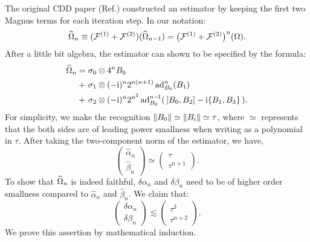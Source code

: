 \documentclass[b5paper,11pt]{article}
\begin{document}
The original CDD paper (Ref.\cite{khodjasteh2005fault}) constructed an estimator by keeping the first two Magnus terms for each iteration step. In
our notation:
\begin{equation}
    \widehat{\Omega}_{n} \equiv (
    \mathcal{F}^{(1)} + 
    \mathcal{F}^{(2)}) (\widehat{\Omega}_{n-1}) = \big(
    \mathcal{F}^{(1)} + 
    \mathcal{F}^{(2)}\big)^n (\Omega).
\end{equation}
After a little bit algebra, the estimator can shown to be specified by the formula:
\begin{align}\label{eq:cdd-estimator}
\widehat{\Omega}_{n} 
={} & \sigma_0 \otimes 4^n B_0 \notag \\
+\ & \sigma_1 \otimes (-\mathrm{i})^{n} 2^{n(n+1)} \operatorname{ad}_{B_0}^{n}(B_1)\\ 
+\ & \sigma_2 \otimes (-\mathrm{i})^{n} 2^{n^2} \operatorname{ad}_{B_0}^{n-\!1}( \,[B_0,B_2] - \mathrm{i} \{B_1,B_3\} \,). \notag
\end{align} 
 For simplicity, we make the recognition $\Vert {B_0} \Vert\simeq\Vert {B_i} \Vert\simeq\tau$, where $\simeq$ represents that the both sides are of leading power smallness when writing as a polynomial in $\tau$.
After taking the two-component norm of the estimator, we have,
\begin{equation}
\begin{pmatrix}
\widehat\alpha_{n}\\
\widehat\beta_{n}
\end{pmatrix}
\simeq
\begin{pmatrix}
\tau\\
\tau^{n+1}
\end{pmatrix}.
\end{equation}
To show that $\widehat{\Omega}_{n}$ is indeed faithful, $\delta\alpha_{n}$ and $\delta\beta_{n}$ need to be of higher order smallness compared to $\widehat\alpha_{n}$ and $\widehat\beta_{n}$. We claim that:
\begin{equation}\label{eq:cdd-error-bounds}
\begin{pmatrix}
\delta\alpha_{n}\\
\delta\beta_{n} 
\end{pmatrix}
\lesssim
\begin{pmatrix}
\tau^3\\
\tau^{n+2} 
\end{pmatrix}.
\end{equation}
We prove this assertion by mathematical induction.
\end{document}
